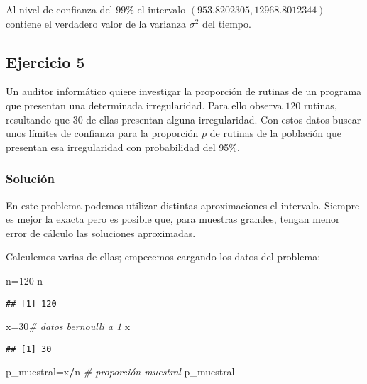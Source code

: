 \documentclass[
]{article}
\newenvironment{Shaded}{\begin{snugshade}}{\end{snugshade}}
\newcommand{\CommentTok}[1]{\textcolor[rgb]{0.56,0.35,0.01}{\textit{#1}}}
\newcommand{\DecValTok}[1]{\textcolor[rgb]{0.00,0.00,0.81}{#1}}
\newcommand{\NormalTok}[1]{#1}
\newcommand{\OperatorTok}[1]{\textcolor[rgb]{0.81,0.36,0.00}{\textbf{#1}}}
\begin{document}
Al nivel de confianza del \(99\%\) el intervalo
\((953.8202305, 12968.8012344)\) contiene el verdadero valor de la
varianza \(\sigma^2\) del tiempo.

\hypertarget{ejercicio-5}{%
\subsection{Ejercicio 5}\label{ejercicio-5}}

Un auditor informático quiere investigar la proporción de rutinas de un
programa que presentan una determinada irregularidad. Para ello observa
\(120\) rutinas, resultando que \(30\) de ellas presentan alguna
irregularidad. Con estos datos buscar unos límites de confianza para la
proporción \(p\) de rutinas de la población que presentan esa
irregularidad con probabilidad del 95\%.

\hypertarget{soluciuxf3n-4}{%
\subsubsection{Solución}\label{soluciuxf3n-4}}

En este problema podemos utilizar distintas aproximaciones el intervalo.
Siempre es mejor la exacta pero es posible que, para muestras grandes,
tengan menor error de cálculo las soluciones aproximadas.

Calculemos varias de ellas; empecemos cargando los datos del problema:

\begin{Shaded}
\begin{Highlighting}[]
\NormalTok{n=}\DecValTok{120}
\NormalTok{n}
\end{Highlighting}
\end{Shaded}

\begin{verbatim}
## [1] 120
\end{verbatim}

\begin{Shaded}
\begin{Highlighting}[]
\NormalTok{x=}\DecValTok{30}\CommentTok{\# datos bernoulli a 1 }
\NormalTok{x}
\end{Highlighting}
\end{Shaded}

\begin{verbatim}
## [1] 30
\end{verbatim}

\begin{Shaded}
\begin{Highlighting}[]
\NormalTok{p\_muestral=x}\OperatorTok{/}\NormalTok{n  }\CommentTok{\# proporción muestral}
\NormalTok{p\_muestral}
\end{Highlighting}
\end{Shaded}
\end{document}

